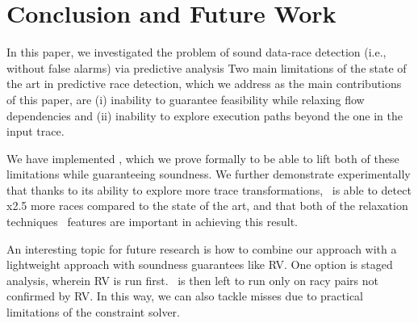 \section{Conclusion and Future Work}

In this paper, we investigated the problem of sound data-race detection (i.e., without false alarms) via predictive analysis
%
Two main limitations of the state of the art in predictive race detection, which we address as the main contributions of this paper, are (i) inability to guarantee feasibility while relaxing flow dependencies and (ii) inability to explore execution paths beyond the one in the input trace. 

We have implemented \sysname, which we prove formally to be able to lift both of these limitations while guaranteeing soundness. We further demonstrate experimentally that thanks to its ability to explore more trace transformations, \sysname\ is able to detect x2.5 more races compared to the state of the art, and that both of the relaxation techniques \sysname\ features are important in achieving this result.

An interesting topic for future research is how  to combine our approach with a lightweight approach with soundness guarantees like {\sf RV}. One option is staged analysis, wherein {\sf RV} is run first. \tool\ is then left to run only on racy pairs not confirmed by {\sf RV}.
In this way, we can also tackle misses due to practical limitations of the constraint solver.